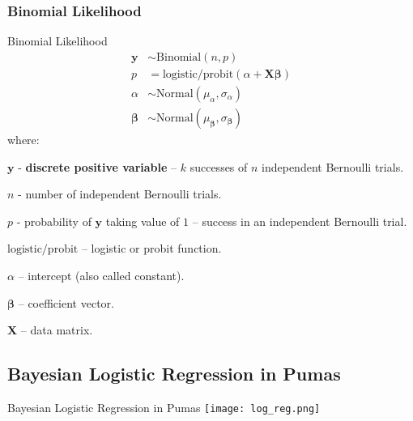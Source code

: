 \subsubsection{Binomial Likelihood}
\begin{frame}{Binomial Likelihood}
    \small
    $$
        \begin{aligned}
            \mathbf{y}         & \sim \text{Binomial}\left(n,  p\right)                                    \\
            p                  & = \text{logistic/probit}(\alpha +  \mathbf{X} \boldsymbol{\beta})         \\
            \alpha             & \sim \text{Normal}(\mu_\alpha, \sigma_\alpha)                             \\
            \boldsymbol{\beta} & \sim \text{Normal}(\mu_{\boldsymbol{\beta}}, \sigma_{\boldsymbol{\beta}})
        \end{aligned}
    $$
    where:
    \begin{vfilleditems}
        \item \small $\mathbf{y}$ - \textbf{discrete positive variable} -- $k$ successes of $n$ independent Bernoulli trials.
        \item \small $n$ - number of independent Bernoulli trials.
        \item \small $p$ - probability of $\mathbf{y}$ taking value of $1$ --
        success in an independent Bernoulli trial.
        \item \small $\text{logistic/probit}$ -- logistic or probit function.
        \item \small $\alpha$ -- intercept (also called constant).
        \item \small $\boldsymbol{\beta}$ -- coefficient vector.
        \item \small $\mathbf{X}$ -- data matrix.
    \end{vfilleditems}
\end{frame}
\subsection{Bayesian Logistic Regression in Pumas}
\begin{frame}{Bayesian Logistic Regression in Pumas}
    \centering
    \texttt{[image: log\_reg.png]}
\end{frame}
